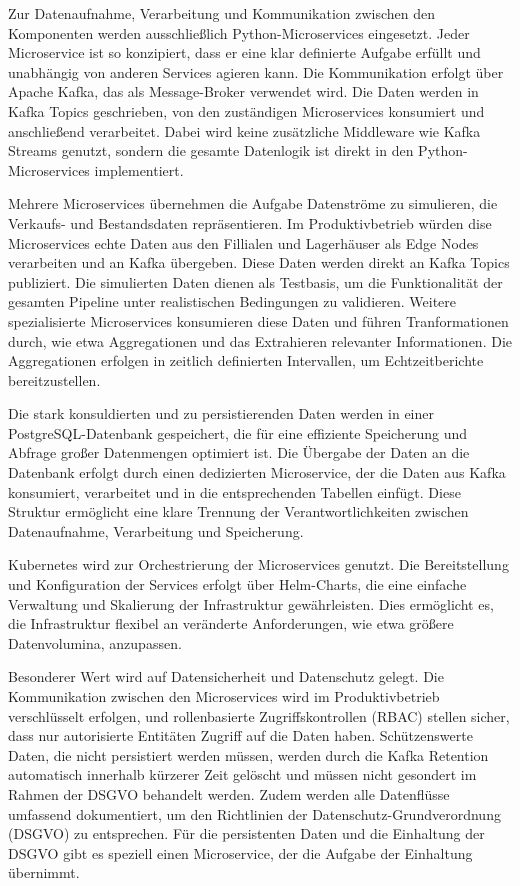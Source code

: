 \documentclass[%
pdftex,
oneside,			%
11pt,				%
parskip=half,		%
headheight = 12pt,	%
headsepline,		%
footsepline,		%
footheight = 16pt,	%
abstracton,		%
DIV=calc,		%
BCOR=8mm,		%
headinclude=false,	%
footinclude=false,	%
listof=totoc,		%
toc=bibliography,	%
]{scrreprt}	%
\begin{document}
    Zur Datenaufnahme, Verarbeitung und Kommunikation zwischen den Komponenten werden ausschließlich Python-Microservices eingesetzt.
    Jeder Microservice ist so konzipiert, dass er eine klar definierte Aufgabe erfüllt und unabhängig von anderen Services agieren kann.
    Die Kommunikation erfolgt über Apache Kafka, das als Message-Broker verwendet wird.
    Die Daten werden in Kafka Topics geschrieben, von den zuständigen Microservices konsumiert und anschließend verarbeitet.
    Dabei wird keine zusätzliche Middleware wie Kafka Streams genutzt, sondern die gesamte Datenlogik ist direkt in den Python-Microservices implementiert.

    Mehrere Microservices übernehmen die Aufgabe Datenströme zu simulieren, die Verkaufs- und Bestandsdaten repräsentieren.
    Im Produktivbetrieb würden dise Microservices echte Daten aus den Fillialen und Lagerhäuser als Edge Nodes verarbeiten und an Kafka übergeben.
    Diese Daten werden direkt an Kafka Topics publiziert.
    Die simulierten Daten dienen als Testbasis, um die Funktionalität der gesamten Pipeline unter realistischen Bedingungen zu validieren.
    Weitere spezialisierte Microservices konsumieren diese Daten und führen Tranformationen durch, wie etwa Aggregationen und das Extrahieren relevanter Informationen.
    Die Aggregationen erfolgen in zeitlich definierten Intervallen, um Echtzeitberichte bereitzustellen.

    Die stark konsuldierten und zu persistierenden Daten werden in einer PostgreSQL-Datenbank gespeichert, die für eine effiziente Speicherung und Abfrage großer Datenmengen optimiert ist.
    Die Übergabe der Daten an die Datenbank erfolgt durch einen dedizierten Microservice, der die Daten aus Kafka konsumiert, verarbeitet und in die entsprechenden Tabellen einfügt.
    Diese Struktur ermöglicht eine klare Trennung der Verantwortlichkeiten zwischen Datenaufnahme, Verarbeitung und Speicherung.

    Kubernetes wird zur Orchestrierung der Microservices genutzt.
    Die Bereitstellung und Konfiguration der Services erfolgt über Helm-Charts, die eine einfache Verwaltung und Skalierung der Infrastruktur gewährleisten.
    Dies ermöglicht es, die Infrastruktur flexibel an veränderte Anforderungen, wie etwa größere Datenvolumina, anzupassen.

    Besonderer Wert wird auf Datensicherheit und Datenschutz gelegt.
    Die Kommunikation zwischen den Microservices wird im Produktivbetrieb verschlüsselt erfolgen, und rollenbasierte Zugriffskontrollen (RBAC) stellen sicher, dass nur autorisierte Entitäten Zugriff auf die Daten haben. %
    Schützenswerte Daten, die nicht persistiert werden müssen, werden durch die Kafka Retention automatisch innerhalb kürzerer Zeit gelöscht und müssen nicht gesondert im Rahmen der DSGVO behandelt werden.
    Zudem werden alle Datenflüsse umfassend dokumentiert, um den Richtlinien der Datenschutz-Grundverordnung (DSGVO) zu entsprechen.
    Für die persistenten Daten und die Einhaltung der DSGVO gibt es speziell einen Microservice, der die Aufgabe der Einhaltung übernimmt.
\end{document}
